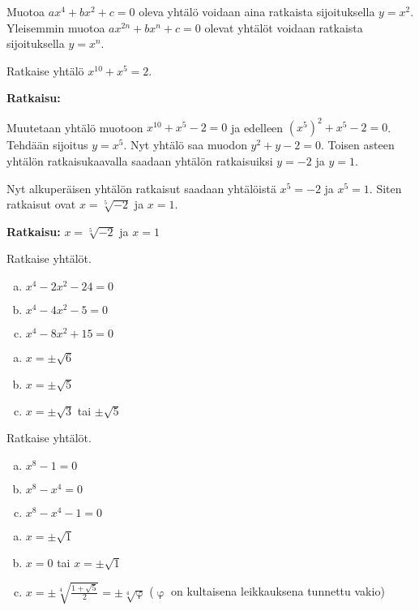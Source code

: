 Muotoa $ax^4+bx^2+c=0$ oleva yhtälö voidaan aina ratkaista sijoituksella $y=x^2$.  Yleisemmin muotoa $ax^{2n}+bx^n+c=0$ olevat yhtälöt voidaan ratkaista sijoituksella $y = x^n$.

\begin{esimerkki}
Ratkaise yhtälö $x^{10}+x^5=2$.

\textbf{Ratkaisu:}

Muutetaan yhtälö muotoon $x^{10}+x^5-2=0$ ja edelleen $(x^5)^2+x^5-2=0$. Tehdään sijoitus $y = x^5$. Nyt yhtälö saa muodon $y^2+y-2 = 0$. Toisen asteen yhtälön ratkaisukaavalla saadaan yhtälön ratkaisuiksi $y = -2$ ja $y = 1$.

Nyt alkuperäisen yhtälön ratkaisut saadaan yhtälöistä $x^5=-2$ ja $x^5=1$. Siten ratkaisut ovat $x = \sqrt[5]{-2}$ ja $x = 1$.

\textbf{Ratkaisu:} $x = \sqrt[5]{-2}$ ja $x = 1$

\end{esimerkki}

\Harjoitustehtavat

\begin{tehtava}
    Ratkaise yhtälöt.
    \begin{enumerate}[a)]
        \item $x^4 - 2x^2 - 24 = 0$
        \item $x^4 - 4x^2 - 5 = 0$
        \item $x^4 - 8x^2 + 15 = 0$
    \end{enumerate}
    \begin{vastaus}
        \begin{enumerate}[a)]
            \item $x = \pm\sqrt{6}$
            \item $x = \pm\sqrt{5}$
            \item $x = \pm\sqrt{3}$ tai $\pm\sqrt{5}$
        \end{enumerate}
    \end{vastaus}
\end{tehtava}

\begin{tehtava}
    Ratkaise yhtälöt.
    \begin{enumerate}[a)]
        \item $x^8 - 1 = 0$
        \item $x^8 - x^4 = 0$
        \item $x^8 - x^4 - 1 = 0$
    \end{enumerate}
    \begin{vastaus}
        \begin{enumerate}[a)]
            \item $x = \pm\sqrt{1}$
            \item $x = 0$ tai $x = \pm\sqrt{1}$
            \item $x = \pm\sqrt[4]{\frac{1+\sqrt{5}}{2}} = \pm\sqrt[4]{\upvarphi}$ ($\upvarphi$ on kultaisena leikkauksena tunnettu vakio)
        \end{enumerate}
    \end{vastaus}
\end{tehtava}

